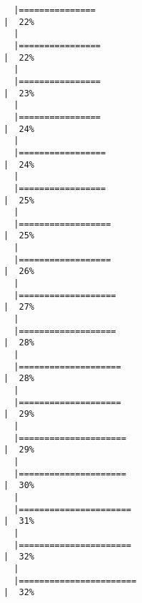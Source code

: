 \documentclass[
  letterpaper,
]{book}
\begin{document}
\begin{verbatim}
  |===============                                                       |  22%
  |                                                                            
  |================                                                      |  22%
  |                                                                            
  |================                                                      |  23%
  |                                                                            
  |================                                                      |  24%
  |                                                                            
  |=================                                                     |  24%
  |                                                                            
  |=================                                                     |  25%
  |                                                                            
  |==================                                                    |  25%
  |                                                                            
  |==================                                                    |  26%
  |                                                                            
  |===================                                                   |  27%
  |                                                                            
  |===================                                                   |  28%
  |                                                                            
  |====================                                                  |  28%
  |                                                                            
  |====================                                                  |  29%
  |                                                                            
  |=====================                                                 |  29%
  |                                                                            
  |=====================                                                 |  30%
  |                                                                            
  |======================                                                |  31%
  |                                                                            
  |======================                                                |  32%
  |                                                                            
  |=======================                                               |  32%

\end{verbatim}
\end{document}
